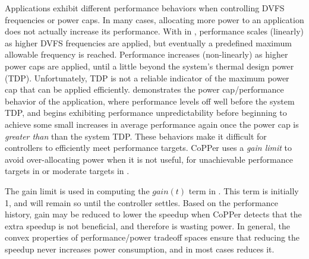 Applications exhibit different performance behaviors when controlling DVFS frequencies or power caps.
In many cases, allocating more power to an application does not actually increase its performance. %
With  in , performance scales (linearly) as higher DVFS frequencies are applied, but eventually a predefined maximum allowable frequency is reached.
Performance increases (non-linearly) as higher power caps are applied, until a little beyond the system's thermal design power (TDP).
Unfortunately, TDP is not a reliable indicator of the maximum power cap that can be applied efficiently.
 demonstrates the power cap/performance behavior of the  application,
where performance levels off well before the system TDP, and begins exhibiting
performance unpredictability before beginning to achieve some small increases in average performance again once the power cap is \emph{greater than} than the system TDP.
These behaviors make it difficult for controllers to efficiently meet performance targets.
CoPPer uses a \emph{gain limit} to avoid over-allocating power when it is not useful, \eg for unachievable performance targets in  or moderate targets in .

The gain limit is used in computing the $gain(t)$ term in .
This term is initially 1, and will remain so until the controller settles.  Based on the performance history, gain may be reduced to lower the speedup when CoPPer detects that the extra speedup is not beneficial, and therefore is wasting power.
In general, the convex properties of performance/power tradeoff spaces ensure that reducing the speedup never increases power consumption, and in most cases reduces it.

